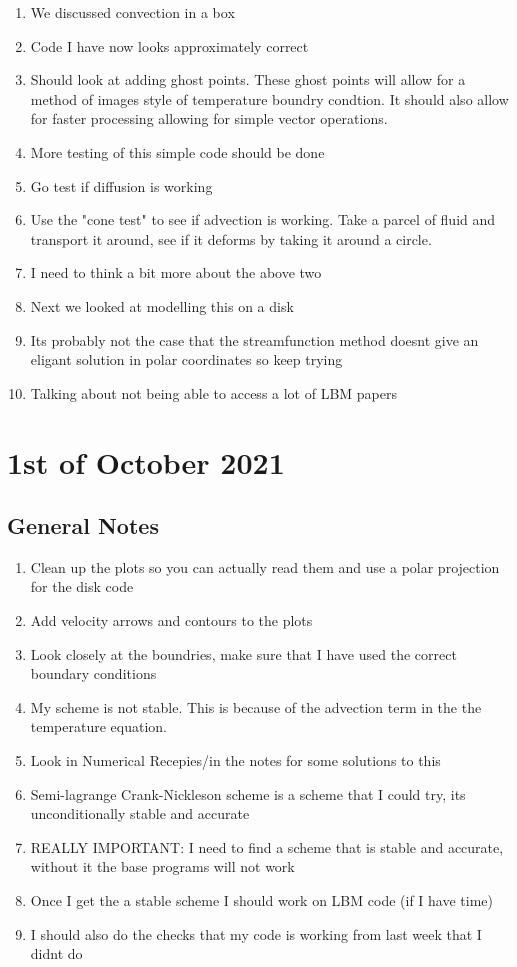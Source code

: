 \documentclass{article}
\begin{document}
\begin{enumerate}
	\item We discussed convection in a box
	\item Code I have now looks approximately correct
	\item Should look at adding ghost points. These ghost points will allow for a method of images style of temperature boundry condtion. It should also allow for faster processing allowing for simple vector operations.
	\item More testing of this simple code should be done
	\item Go test if diffusion is working
	\item Use the "cone test" to see if advection is working. Take a parcel of fluid and transport it around, see if it deforms by taking it around a circle.
	\item I need to think a bit more about the above two
	\item Next we looked at modelling this on a disk
	\item Its probably not the case that the streamfunction method doesnt give an eligant solution in polar coordinates so keep trying
	\item Talking about not being able to access a lot of LBM papers
\end{enumerate}

\section*{1st of October 2021}

\subsection*{General Notes}

\begin{enumerate}

	\item Clean up the plots so you can actually read them and use a polar projection for the disk code
	\item Add velocity arrows and contours to the plots
	\item Look closely at the boundries, make sure that I have used the correct boundary conditions
	\item My scheme is not stable. This is because of the advection term in the the temperature equation.
	\item Look in Numerical Recepies/in the notes for some solutions to this
	\item Semi-lagrange Crank-Nickleson scheme is a scheme that I could try, its unconditionally stable and accurate
	\item REALLY IMPORTANT: I need to find a scheme that is stable and accurate, without it the base programs will not work
	\item Once I get the a stable scheme I should work on LBM code (if I have time)
	\item I should also do the checks that my code is working from last week that I didnt do

\end{enumerate}


\newpage
\end{document}
